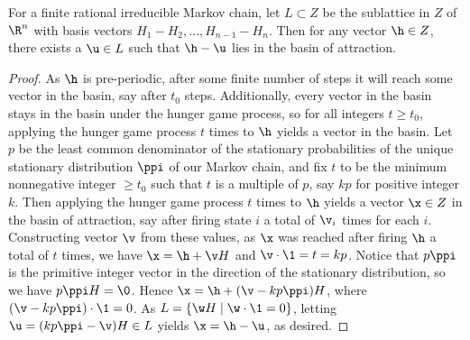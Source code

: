 \begin{proposition}\label{proposition: basin covers hyperplane}
For a finite rational irreducible Markov chain, 
let $L\subset Z$ be the sublattice in $Z$ of $\R^n$ 
with basis vectors $H_1-H_2,\dots,H_{n-1}-H_n$.
Then for any vector $\h\in Z$, there exists a $\u\in L$ 
such that $\h-\u$ lies in the basin of attraction.
\end{proposition}
\begin{proof}
As $\h$ is pre-periodic, after some finite number of steps 
it will reach some vector in the basin, say after $t_0$ steps.
Additionally, every vector in the basin 
stays in the basin under the hunger game process, 
so for all integers $t \geq t_0$, 
applying the hunger game process $t$ times to $\h$ yields a vector in the basin.
Let $p$ be the least common denominator of the stationary probabilities 
of the unique stationary distribution $\ppi$ of our Markov chain, 
and fix $t$ to be the minimum nonnegative integer $\geq t_0$ such that 
$t$ is a multiple of $p$, say $kp$ for positive integer $k$.
Then applying the hunger game process $t$ times to $\h$ 
yields a vector $\x \in Z$ in the basin of attraction, 
say after firing state $i$ a total of $\v_i$ times for each $i$.
Constructing vector $\v$ from these values, 
as $\x$ was reached after firing $\h$ a total of $t$ times, 
we have $\x=\h+\v H$ and $\v\cdot\1=t=kp$.
Notice that $p\ppi$ is the primitive integer vector 
in the direction of the stationary distribution, so we have $p\ppi H= \0$.
Hence $\x = \h + (\v - kp\ppi)H$, where $(\v-kp\ppi)\cdot \1 = 0$.
As $L=\{\w H\mid\w\cdot\1=0\}$, 
letting $\u=(kp\ppi-\v)H\in L$ yields $\x = \h - \u$, as desired.
\end{proof}
